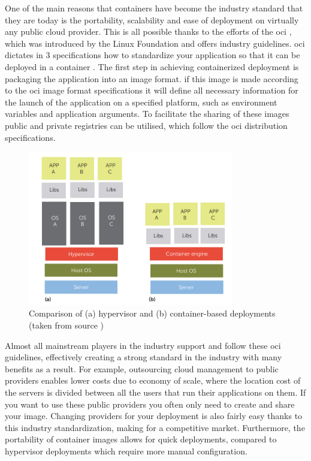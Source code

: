 One of the main reasons that containers have become the industry standard that they are today is the portability, scalability and ease of deployment on virtually any public cloud provider. This is all possible thanks to the efforts of the \acrfull{oci} \cite{OCI}, which was introduced by the Linux Foundation \cite{linuxfoundation} and offers industry guidelines. \acrshort{oci} dictates in 3 specifications how to standardize your application so that it can be deployed in a container \cite{opencontainers}. The first step in achieving containerized deployment is packaging the application into an image format. if this image is made according to the \acrshort{oci} image format specifications it will define all necessary information for the launch of the application on a specified platform, such as environment variables and application arguments. To facilitate the sharing of these images public and private registries can be utilised, which follow the \acrshort{oci} distribution specifications.
\\[10pt]


\begin{figure}[htbp]
  \centering
  \includegraphics[width=0.8\textwidth]{images/bernstein-hypervisor-vs-container-deployment.png} 
  \caption{Comparison of (a) hypervisor and (b) container-based deployments (taken from source \cite{Bernstein2014})}
  \label{fig:compdeployment}
\end{figure}

Almost all mainstream players in the industry support and follow these \acrshort{oci} guidelines, effectively creating a strong standard in the industry with many benefits as a result. For example, outsourcing cloud management to public providers enables lower costs due to economy of scale, where the location cost of the servers is divided between all the users that run their applications on them. If you want to use these public providers you often only need to create and share your image. Changing providers for your deployment is also fairly easy thanks to this industry standardization, making for a competitive market. Furthermore, the portability of container images allows for quick deployments, compared to hypervisor deployments which require more manual configuration. 
\\[10pt]




